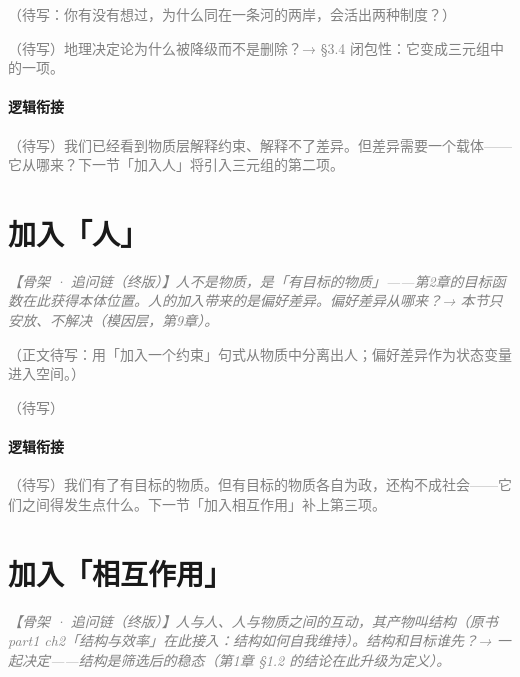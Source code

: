 \documentclass[../../main2.tex]{subfiles}
\begin{document}
	\begin{readingnote}
		\textcolor{gray}{（待写：你有没有想过，为什么同在一条河的两岸，会活出两种制度？）}
	\end{readingnote}

	\begin{reader_anticipation}
		\item \textcolor{gray}{（待写）地理决定论为什么被降级而不是删除？→ §3.4 闭包性：它变成三元组中的一项。}
	\end{reader_anticipation}

	\paragraph*{逻辑衔接}
	\textcolor{gray}{（待写）我们已经看到物质层解释约束、解释不了差异。但差异需要一个载体——它从哪来？下一节「加入人」将引入三元组的第二项。}

	\section{加入「人」}
	\label{sec:state-people}

	\textcolor{gray}{\textit{【骨架 · 追问链（终版）】人不是物质，是「有目标的物质」——第2章的目标函数在此获得本体位置。人的加入带来的是偏好差异。偏好差异从哪来？→ 本节只安放、不解决（模因层，第9章）。}}

	\textcolor{gray}{（正文待写：用「加入一个约束」句式从物质中分离出人；偏好差异作为状态变量进入空间。）}

	\begin{readingnote}
		\textcolor{gray}{（待写）}
	\end{readingnote}

	\paragraph*{逻辑衔接}
	\textcolor{gray}{（待写）我们有了有目标的物质。但有目标的物质各自为政，还构不成社会——它们之间得发生点什么。下一节「加入相互作用」补上第三项。}

	\section{加入「相互作用」}
	\label{sec:state-interaction}

	\textcolor{gray}{\textit{【骨架 · 追问链（终版）】人与人、人与物质之间的互动，其产物叫结构（原书 part1 ch2「结构与效率」在此接入：结构如何自我维持）。结构和目标谁先？→ 一起决定——结构是筛选后的稳态（第1章 §1.2 的结论在此升级为定义）。}}
\end{document}
